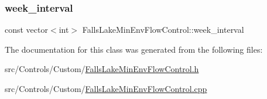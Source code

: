 \subsubsection{\texorpdfstring{week\+\_\+interval}{week\_interval}}
{\footnotesize\ttfamily const vector$<$int$>$ Falls\+Lake\+Min\+Env\+Flow\+Control\+::week\+\_\+interval\hspace{0.3cm}{\ttfamily [private]}}



The documentation for this class was generated from the following files\+:\begin{DoxyCompactItemize}
\item 
src/\+Controls/\+Custom/\mbox{\hyperlink{FallsLakeMinEnvFlowControl_8h}{Falls\+Lake\+Min\+Env\+Flow\+Control.\+h}}\item 
src/\+Controls/\+Custom/\mbox{\hyperlink{FallsLakeMinEnvFlowControl_8cpp}{Falls\+Lake\+Min\+Env\+Flow\+Control.\+cpp}}\end{DoxyCompactItemize}
